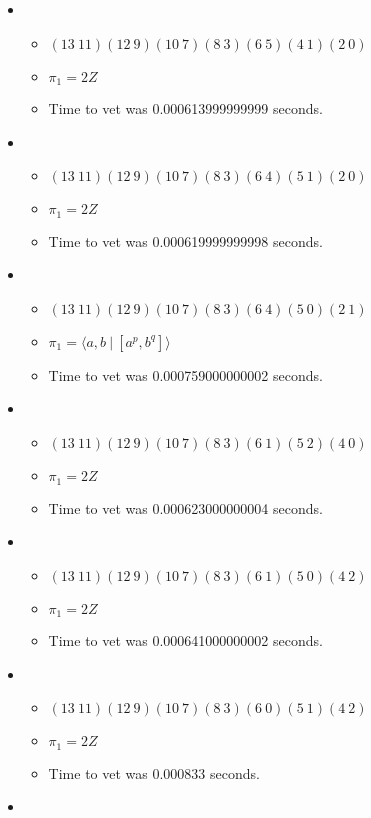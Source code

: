 \documentclass{article}
\begin{document}
\begin{itemize}
\begin{itemize}
\end{itemize}
\item \begin{itemize}
      \item $(13\ 11)(12\ 9)(10\ 7)(8\ 3)(6\ 5)(4\ 1)(2\ 0)$
      \item $\pi_1 =2 Z$
      \item Time to vet was 0.000613999999999 seconds.
\end{itemize}
\item \begin{itemize}
      \item $(13\ 11)(12\ 9)(10\ 7)(8\ 3)(6\ 4)(5\ 1)(2\ 0)$
      \item $\pi_1 =2 Z$
      \item Time to vet was 0.000619999999998 seconds.
\end{itemize}
\item \begin{itemize}
      \item $(13\ 11)(12\ 9)(10\ 7)(8\ 3)(6\ 4)(5\ 0)(2\ 1)$
      \item $\pi_1 = \langle a,b\ |\ [a^p,b^q]\rangle$
      \item Time to vet was 0.000759000000002 seconds.
\end{itemize}
\item \begin{itemize}
      \item $(13\ 11)(12\ 9)(10\ 7)(8\ 3)(6\ 1)(5\ 2)(4\ 0)$
      \item $\pi_1 =2 Z$
      \item Time to vet was 0.000623000000004 seconds.
\end{itemize}
\item \begin{itemize}
      \item $(13\ 11)(12\ 9)(10\ 7)(8\ 3)(6\ 1)(5\ 0)(4\ 2)$
      \item $\pi_1 =2 Z$
      \item Time to vet was 0.000641000000002 seconds.
\end{itemize}
\item \begin{itemize}
      \item $(13\ 11)(12\ 9)(10\ 7)(8\ 3)(6\ 0)(5\ 1)(4\ 2)$
      \item $\pi_1 =2 Z$
      \item Time to vet was 0.000833 seconds.
\end{itemize}
\item \begin{itemize}

\end{itemize}
\end{itemize}
\end{document}
